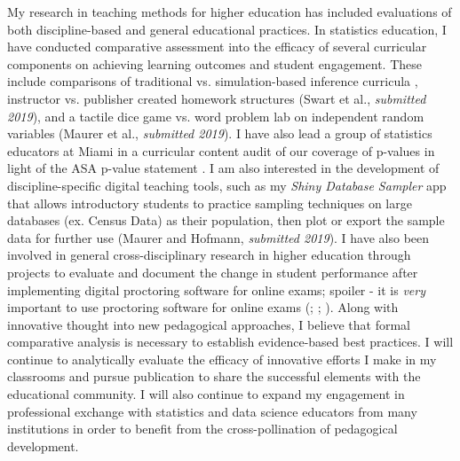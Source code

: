 \documentclass[letterpaper,12pt]{article}\usepackage[]{graphicx}\usepackage[]{color}
\begin{document}
My research in teaching methods for higher education has included evaluations of both discipline-based and general educational practices. In statistics education, I have conducted comparative assessment into the efficacy of several curricular components on achieving learning outcomes and student engagement. These include comparisons of traditional vs. simulation-based inference curricula \citep{maurer2016comparison}, instructor vs. publisher created homework structures (Swart et al., {\it submitted 2019}), and a tactile dice game vs. word problem lab on independent random variables (Maurer et al., {\it submitted 2019}). I have also lead a group of statistics educators at Miami in a curricular content audit of our coverage of p-values in light of the ASA p-value statement \citep{maurer2019content}. I am also interested in the development of discipline-specific digital teaching tools, such as my {\it Shiny Database Sampler} app that allows introductory students to practice sampling techniques on large databases (ex. Census Data) as their population, then plot or export the sample data for further use (Maurer and Hofmann, {\it submitted 2019}). I have also been involved in general cross-disciplinary research in higher education through projects to evaluate and document the change in student performance after implementing digital proctoring software for online exams; spoiler - it is {\it very} important to use proctoring software for online exams (\citealt{alessio2018impact}; \citealt{alessio2018international}; \citealt{alessio2017examining}). Along with innovative thought into new pedagogical approaches, I believe that formal comparative analysis is necessary to establish evidence-based best practices. I will continue to analytically evaluate the efficacy of innovative efforts I make in my classrooms and pursue publication to share the successful elements with the educational community. I will also continue to expand my engagement in professional exchange with statistics and data science educators from many institutions in order to benefit from the cross-pollination of pedagogical development. 
\end{document}
